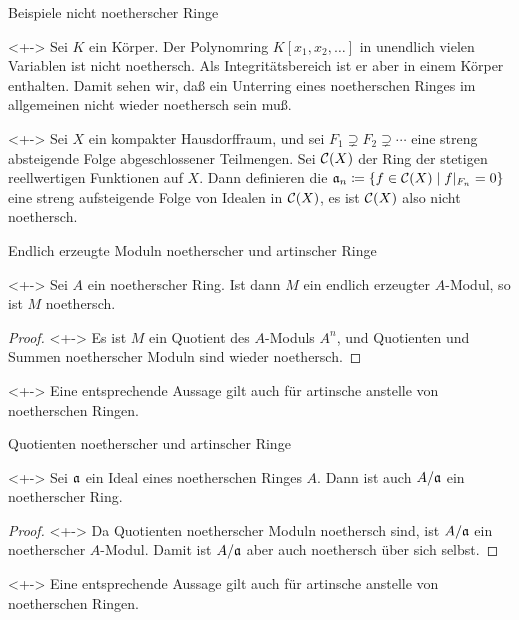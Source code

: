\begin{frame}{Beispiele nicht noetherscher Ringe}
	\begin{example}<+->
		Sei \(K\) ein Körper. Der Polynomring \(K[x_1, x_2, \dotsc]\) in unendlich vielen
		Variablen ist nicht noethersch. Als Integritätsbereich ist er aber in einem Körper
		enthalten. Damit sehen wir, daß ein Unterring eines noetherschen Ringes im allgemeinen
		nicht wieder noethersch sein muß.
	\end{example}
	\begin{example}<+->
		Sei \(X\) ein kompakter Hausdorffraum, und sei \(F_1 \supsetneq F_2 \supsetneq \dotsb\)
		eine streng absteigende Folge abgeschlossener Teilmengen. Sei \(\mathcal{C}(X)\) der Ring
		der stetigen reellwertigen Funktionen auf \(X\). Dann definieren die
		\(\mathfrak{a}_n \coloneqq \{f \in \mathcal{C}(X) \mid f|_{F_n} = 0\}\) eine streng aufsteigende
		Folge von Idealen in \(\mathcal{C}(X)\), es ist \(\mathcal{C}(X)\) also nicht noethersch.
	\end{example}
\end{frame}

\begin{frame}{Endlich erzeugte Moduln noetherscher und artinscher Ringe}
	\begin{proposition}<+->
		Sei \(A\) ein noetherscher Ring. Ist dann \(M\) ein endlich erzeugter
		\(A\)-Modul, so ist \(M\) noethersch.
	\end{proposition}
	\begin{proof}<+->
		Es ist \(M\) ein Quotient des \(A\)-Moduls \(A^n\), und Quotienten und Summen
		noetherscher Moduln sind wieder noethersch.
	\end{proof}
	\begin{remark}<+->
		Eine entsprechende Aussage gilt auch für artinsche anstelle von noetherschen
		Ringen.
	\end{remark}
\end{frame}

\begin{frame}{Quotienten noetherscher und artinscher Ringe}
	\begin{proposition}<+->
		Sei \(\mathfrak{a}\) ein Ideal eines noetherschen Ringes \(A\). Dann
		ist auch \(A/\mathfrak{a}\) ein noetherscher Ring.
	\end{proposition}
	\begin{proof}<+->
		Da Quotienten noetherscher Moduln noethersch sind, ist \(A/\mathfrak{a}\)
		ein noetherscher \(A\)-Modul. Damit ist \(A/\mathfrak{a}\) aber auch
		noethersch über sich selbst.
	\end{proof}
	\begin{remark}<+->
		Eine entsprechende Aussage gilt auch für artinsche anstelle von noetherschen
		Ringen.
	\end{remark}
\end{frame}

